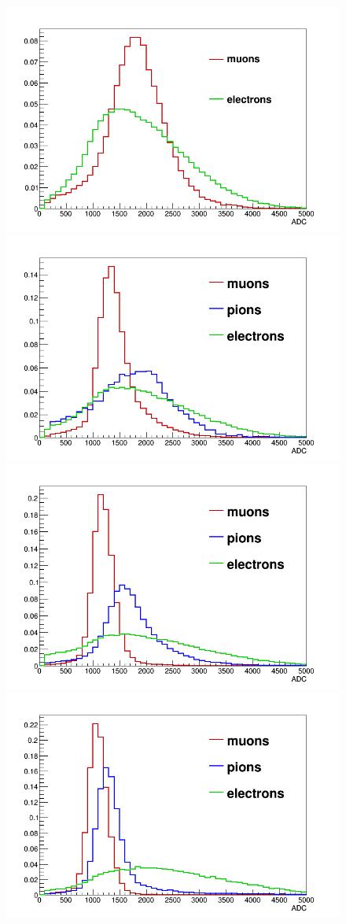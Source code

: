 
\begin{figure}[htb!]
 	\begin{center}
		\includegraphics[width=0.45\columnwidth]{./04-KL/Figures/mu_vs_e_140MEV.png}
 		\includegraphics[width=0.45\columnwidth]{./04-KL/Figures/mu_vs_pi_vs_e_170MEV.png} 
 		\includegraphics[width=0.45\columnwidth]{./04-KL/Figures/mu_vs_pi_vs_e_200MEV.png} 		
 		\includegraphics[width=0.45\columnwidth]{./04-KL/Figures/mu_vs_pi_vs_e_240MEV.png}  	

\end{center}
\end{figure}
